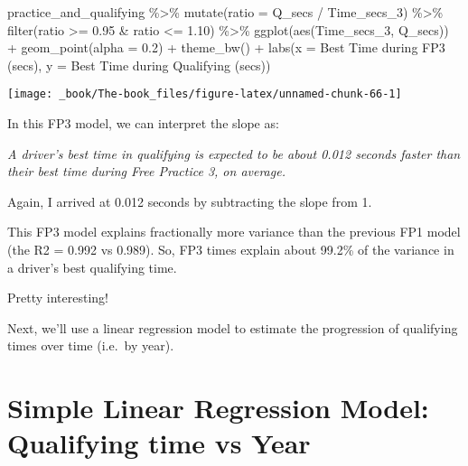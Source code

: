 \documentclass[
]{book}
\newenvironment{Shaded}{\begin{snugshade}}{\end{snugshade}}
\newcommand{\AttributeTok}[1]{\textcolor[rgb]{0.77,0.63,0.00}{#1}}
\newcommand{\FloatTok}[1]{\textcolor[rgb]{0.00,0.00,0.81}{#1}}
\newcommand{\FunctionTok}[1]{\textcolor[rgb]{0.00,0.00,0.00}{#1}}
\newcommand{\NormalTok}[1]{#1}
\newcommand{\SpecialCharTok}[1]{\textcolor[rgb]{0.00,0.00,0.00}{#1}}
\newcommand{\StringTok}[1]{\textcolor[rgb]{0.31,0.60,0.02}{#1}}
\begin{document}
\begin{Shaded}
\begin{Highlighting}[]
\NormalTok{practice\_and\_qualifying }\SpecialCharTok{\%\textgreater{}\%}
  \FunctionTok{mutate}\NormalTok{(}\AttributeTok{ratio =}\NormalTok{ Q\_secs }\SpecialCharTok{/}\NormalTok{ Time\_secs\_3) }\SpecialCharTok{\%\textgreater{}\%} 
  \FunctionTok{filter}\NormalTok{(ratio }\SpecialCharTok{\textgreater{}=} \FloatTok{0.95} \SpecialCharTok{\&}\NormalTok{ ratio }\SpecialCharTok{\textless{}=} \FloatTok{1.10}\NormalTok{) }\SpecialCharTok{\%\textgreater{}\%} 
  \FunctionTok{ggplot}\NormalTok{(}\FunctionTok{aes}\NormalTok{(Time\_secs\_3, Q\_secs)) }\SpecialCharTok{+}
  \FunctionTok{geom\_point}\NormalTok{(}\AttributeTok{alpha =} \FloatTok{0.2}\NormalTok{) }\SpecialCharTok{+}
  \FunctionTok{theme\_bw}\NormalTok{() }\SpecialCharTok{+}
  \FunctionTok{labs}\NormalTok{(}\AttributeTok{x =} \StringTok{\textquotesingle{}Best Time during FP3 (secs)\textquotesingle{}}\NormalTok{,}
       \AttributeTok{y =} \StringTok{\textquotesingle{}Best Time during Qualifying (secs)\textquotesingle{}}\NormalTok{)}
\end{Highlighting}
\end{Shaded}

\begin{center}\texttt{[image: \_book/The-book\_files/figure-latex/unnamed-chunk-66-1]} \end{center}

In this FP3 model, we can interpret the slope as:

\emph{A driver's best time in qualifying is expected to be about 0.012 seconds faster than their best time during Free Practice 3, on average.}

Again, I arrived at 0.012 seconds by subtracting the slope from 1.

This FP3 model explains fractionally more variance than the previous FP1 model (the R2 = 0.992 vs 0.989). So, FP3 times explain about 99.2\% of the variance in a driver's best qualifying time.

Pretty interesting!

Next, we'll use a linear regression model to estimate the progression of qualifying times over time (i.e.~by year).

\hypertarget{simple-linear-regression-model-qualifying-time-vs-year}{%
\section{Simple Linear Regression Model: Qualifying time vs Year}\label{simple-linear-regression-model-qualifying-time-vs-year}}
\end{document}
